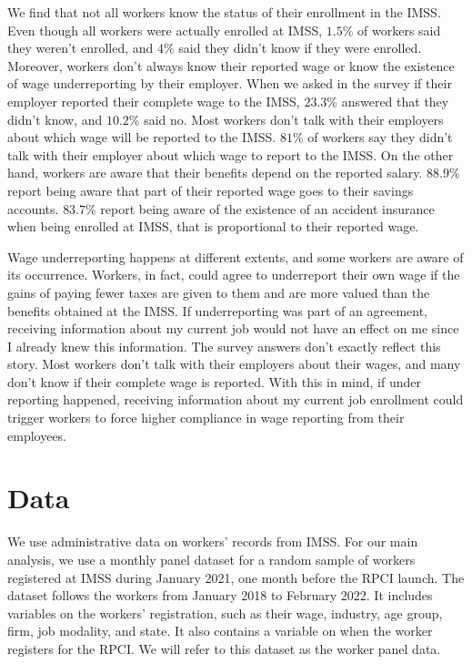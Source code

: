 \documentclass[oneside,11pt]{article}
\begin{document}
We find that not all workers know the status of their enrollment in the IMSS. Even though all workers were actually enrolled at IMSS, $1.5\%$ of workers said they weren't enrolled, and $4\%$ said they didn't know if they were enrolled. Moreover, workers don't always know their reported wage or know the existence of wage underreporting by their employer. When we asked in the survey if their employer reported their complete wage to the IMSS, $23.3\%$ answered that they didn't know, and $10.2\%$ said no. Most workers don't talk with their employers about which wage will be reported to the IMSS. $81\%$ of workers say they didn't talk with their employer about which wage to report to the IMSS. On the other hand, workers are aware that their benefits depend on the reported salary. $88.9\%$ report being aware that part of their reported wage goes to their savings accounts. $83.7\%$ report being aware of the existence of an accident insurance when being enrolled at IMSS, that is proportional to their reported wage.

Wage underreporting happens at different extents, and some workers are aware of its occurrence. Workers, in fact, could agree to underreport their own wage if the gains of paying fewer taxes are given to them and are more valued than the benefits obtained at the IMSS. If underreporting was part of an agreement, receiving information about my current job would not have an effect on me since I already knew this information. The survey answers don't exactly reflect this story. Most workers don't talk with their employers about their wages, and many don't know if their complete wage is reported. With this in mind, if under reporting happened, receiving information about my current job enrollment could trigger workers to force higher compliance in wage reporting from their employees.

\section{Data} \label{data}

We use administrative data on workers' records from IMSS. For our main analysis, we use a monthly panel dataset for a random sample of workers registered at IMSS during January 2021, one month before the RPCI launch. The dataset follows the workers from January 2018 to February 2022. It includes variables on the workers' registration, such as their wage, industry, age group, firm, job modality, and state. It also contains a variable on when the worker registers for the RPCI. We will refer to this dataset as the worker panel data.
\end{document}
